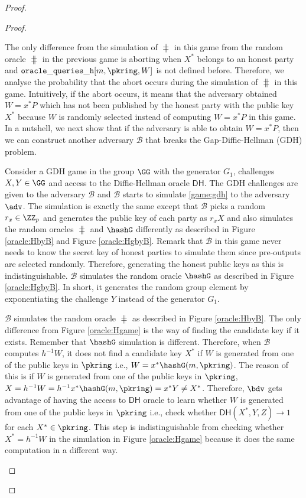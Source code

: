 \begin{proof}
\begin{proof}
\begin{enumerate}[label={{Game} }{{\arabic*}}, start = 0]
			The only difference from the simulation of $ \hash $ in this game from the random oracle $ \hash $ in the previous game is aborting when $ X^* $ belongs to an honest party and $  \mathtt{oracle\_queries\_h}[m, \pkring, W]  $ is not defined before. Therefore, we analyse the probability that the abort occurs during the simulation of $ \hash $ in this game. Intuitively, if the abort occurs, it means that the adversary obtained $ W = x^*P $ which has not been published by the honest party with the public key $ X^* $ because $ W $ is randomly selected instead of computing $ W = x^*P $ in this game. In a nutshell, we next show that if the adversary is able to obtain $ W = x^*P $, then we can construct another adversary $ \mathcal{B} $ that breaks the Gap-Diffie-Hellman (GDH) problem.
			
			Consider a GDH game in the group $ \GG $ with the generator $ G_1 $, challenges $ X, Y \in \GG$ and access to the Diffie-Hellman oracle $ \mathsf{DH} $. The GDH challenges are given to the adversary $ \mathcal{B} $ and $ \mathcal{B} $ starts to simulate \ref{game:gdh} to the adversary $ \adv $. The simulation is exactly the same except that $ \mathcal{B} $ picks a random $ r_x \in \ZZ_p $ and generates the public key of each party as $ r_xX $ and also simulates the random oracles $ \hash $ and $ \hashG $ differently as described in Figure \ref{oracle:HbyB} and Figure \ref{oracle:HgbyB}. Remark that $ \mathcal{B} $ in this game never needs to know the secret key of honest parties to simulate them since pre-outputs are selected randomly. Therefore, generating the honest public keys as this is indistinguishable. 			
			$ \mathcal{B} $ simulates the random oracle $ \hashG $ as described in Figure \ref{oracle:HgbyB}. In short, it generates the random group element by exponentiating the challenge $ Y $  instead of the generator $ G_1 $.  
			
			$ \mathcal{B} $ simulates the random oracle $ \hash $ as described in Figure \ref{oracle:HbyB}. The only difference from Figure \ref{oracle:Hgame} is the way of finding the candidate key if it exists. Remember that $ \hashG $ simulation is different. Therefore, when $ \mathcal{B} $ computes $ h^{-1}W $, it does not find a candidate key $ X^* $ if $ W $ is generated from one of the public keys in $ \pkring $ i.e., $ W = x^*\hashG(m, \pkring) $. The reason of this is if $ W $ is generated from one of the public keys in $ \pkring $, $X =  h^{-1}W = h^{-1} x^*\hashG(m, \pkring)  = x^*Y \neq X^*$. Therefore, $ \bdv $ gets advantage of having the access to $ \mathsf{DH} $ oracle to learn whether $ W $ is generated from one of the public keys in $ \pkring $ i.e., check whether $ \mathsf{DH}(X^*, Y, Z) \rightarrow 1$ for each $ X^* \in \pkring $. This step is indistinguishable from checking whether $ X^* = h^{-1}W $ in the simulation in Figure \ref{oracle:Hgame} because it does the same computation in a different way.
			

\end{enumerate}
\end{proof}
\end{proof}
